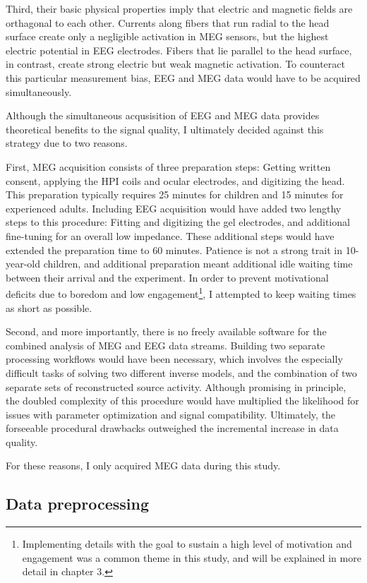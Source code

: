 Third, their basic physical properties imply that electric and magnetic fields are orthagonal to each other.
Currents along fibers that run radial to the head surface create only a negligible activation in MEG sensors, but the highest electric potential in EEG electrodes.
Fibers that lie parallel to the head surface, in contrast, create strong electric but weak magnetic activation.
To counteract this particular measurement bias, EEG and MEG data would have to be acquired simultaneously.


Although the simultaneous acqusisition of EEG and MEG data provides theoretical benefits to the signal quality, I ultimately decided against this strategy due to two reasons.

First, MEG acquisition consists of three preparation steps: Getting written consent, applying the HPI coils and ocular electrodes, and digitizing the head.
This preparation typically requires 25 minutes for children and 15 minutes for experienced adults.
Including EEG acquisition would have added two lengthy steps to this procedure: Fitting and digitizing the gel electrodes, and additional fine-tuning for an overall low impedance.
These additional steps would have extended the preparation time to 60 minutes.
Patience is not a strong trait in 10-year-old children, and additional preparation meant additional idle waiting time between their arrival and the experiment.
In order to prevent motivational deficits due to boredom and low engagement\footnote{Implementing details with the goal to sustain a high level of motivation and engagement was a common theme in this study, and will be explained in more detail in chapter 3.}, I attempted to keep waiting times as short as possible.

Second, and more importantly, there is no freely available software for the combined analysis of MEG and EEG data streams.
Building two separate processing workflows would have been necessary, which involves the especially difficult tasks of solving two different inverse models, and the combination of two separate sets of reconstructed source activity.
Although promising in principle, the doubled complexity of this procedure would have multiplied the likelihood for issues with parameter optimization and signal compatibility.
Ultimately, the forseeable procedural drawbacks outweighed the incremental increase in data quality.

For these reasons, I only acquired MEG data during this study.

\subsection{Data preprocessing}

